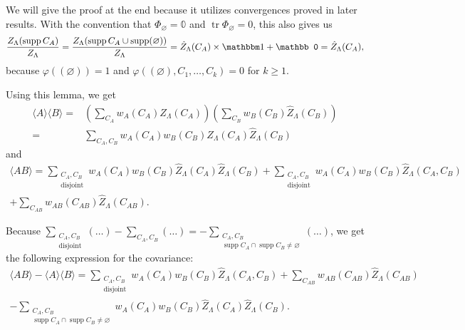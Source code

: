 \documentclass{article}
\DeclareMathOperator{\disj}{disjoint}
\DeclareMathOperator{\tr}{tr}
\DeclareMathOperator{\supp}{supp}
\begin{document}
        We will give the proof at the end because it utilizes convergences proved in later results.
    With the convention that $\Phi_\varnothing=\mathbb 0$ and $\tr \Phi_\varnothing=0$, this also gives us $$
        \frac{Z_\Lambda(\supp C_A)}{Z_\Lambda}=\frac{Z_\Lambda(\supp C_A\cup \supp (\varnothing))}{Z_\Lambda}=\hat Z_\Lambda(C_A)\times\mathbbm 1+ \mathbb 0=\hat Z_\Lambda(C_A),
    $$
    because $\varphi((\varnothing))=1$ and $\varphi((\varnothing),C_1,\ldots,C_k)=0$ for $k\geq 1$.

    
 Using this lemma, we get \begin{align*}
 \langle A\rangle\langle B \rangle =& \left(\sum_{C_A}w_A(C_A)\hat Z_\Lambda(C_A)\right)\left(\sum_{C_B}w_B(C_B)\hat Z_\Lambda(C_B)\right)\\
 =&\sum_{C_A,C_B}w_A(C_A)w_B(C_B)\hat Z_\Lambda(C_A)\hat Z_\Lambda(C_B) 
 \end{align*}
 and 
 \begin{align*}
     \langle AB\rangle =\sum_{\substack{C_A,C_B\\\disj}}w_A(C_A)w_B(C_B)\hat Z_\Lambda(C_A)\hat Z_\Lambda(C_B)+\sum_{\substack{C_A,C_B\\\disj}}w_A(C_A)w_B(C_B)\hat Z_\Lambda(C_A,C_B)&
     \\
     +\sum_{C_{AB}}w_{AB}(C_{AB})\hat Z_{\Lambda}(C_{AB}).&
 \end{align*}
 
 Because $\sum_{\substack{C_A,C_B\\\disj}}(\ldots)-\sum_{C_A,C_B}(\ldots)=-\sum_{\substack{C_A,C_B\\\supp C_A\cap \supp C_B\neq \varnothing}}(\ldots)$,
 we get the following expression for the covariance:
 \begin{align}
     \label{eq: covariance}
     \langle AB\rangle - \langle A\rangle \langle B\rangle =\sum_{\substack{C_A,C_B\\\disj}}w_A(C_A)w_B(C_B)\hat Z_\Lambda(C_A,C_B)
     +\sum_{C_{AB}}w_{AB}(C_{AB})\hat Z_{\Lambda}(C_{AB})\\
     -\sum_{\substack{C_A,C_B\\\supp C_A\cap \supp C_B\neq \varnothing}}w_A(C_A)w_B(C_B)\hat Z_\Lambda(C_A)\hat Z_\Lambda(C_B).
\end{align}
\end{document}
